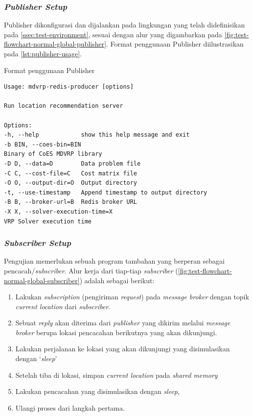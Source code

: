 \subsubsection{\textit{Publisher Setup}}
Publisher dikonfigurasi dan dijalankan pada lingkungan yang telah didefinisikan pada \autoref{ssec:test-environment}, sesuai dengan alur yang digambarkan pada \autoref{fig:test-flowchart-normal-global-publisher}. Format penggunaan Publisher diilustrasikan pada \autoref{lst:publisher-usage}.


\begin{listing}[!]
	\captionsetup{format=hang}
	\caption{Format penggunaan Publisher}
	\label{lst:publisher-usage}
	\begin{verbatim}
Usage: mdvrp-redis-producer [options]

Run location recommendation server

Options:
-h, --help            show this help message and exit
-b BIN, --coes-bin=BIN
Binary of CoES MDVRP library
-D D, --data=D        Data problem file
-C C, --cost-file=C   Cost matrix file
-O O, --output-dir=O  Output directory
-t, --use-timestamp   Append timestamp to output directory
-B B, --broker-url=B  Redis broker URL
-X X, --solver-execution-time=X
VRP Solver execution time
	\end{verbatim}
\end{listing}


\subsubsection{\textit{Subscriber Setup}}
\label{sssec:subscriber-setup}
Pengujian memerlukan sebuah program tambahan yang berperan sebagai pencacah/\textit{subscriber}. Alur kerja dari tiap-tiap \textit{subscriber} (\autoref{fig:test-flowchart-normal-global-subscriber}) adalah sebagai berikut:


\begin{enumerate}
	\item Lakukan \textit{subscription} (pengiriman \textit{request}) pada \textit{message broker} dengan topik \textit{current location} dari \textit{subscriber}. 
	\item Sebuat \textit{reply} akan diterima dari \textit{publisher} yang dikirim melalui \textit{message broker} berupa lokasi pencacahan berikutnya yang akan dikunjungi. 
	\item Lakukan perjalanan ke lokasi yang akan dikunjungi yang disimulasikan dengan `\textit{sleep}'
	\item Setelah tiba di lokasi, simpan \textit{current location} pada \textit{shared memory} 
	\item Lakukan pencacahan yang disimulasikan dengan \textit{sleep}, 
	\item Ulangi proses dari langkah pertama.
\end{enumerate}


